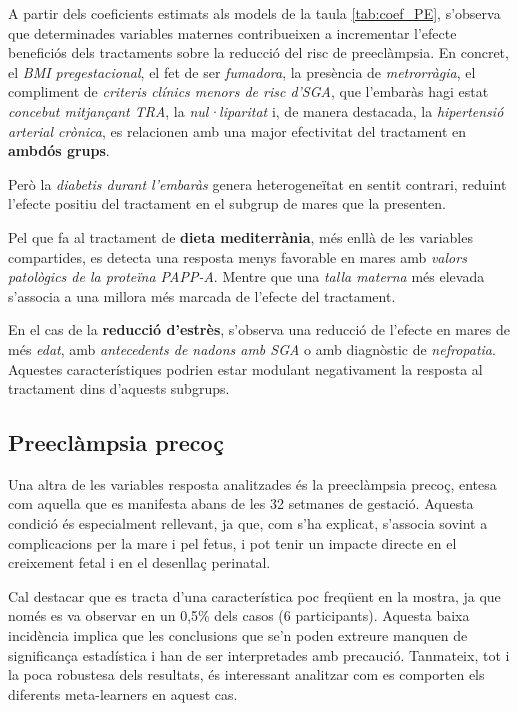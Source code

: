 \documentclass[../main.tex]{subfiles}
\begin{document}
    A partir dels coeficients estimats als models de la taula \ref{tab:coef_PE}, s’observa que determinades variables maternes contribueixen a incrementar l’efecte beneficiós dels tractaments sobre la reducció del risc de preeclàmpsia. En concret, el \textit{BMI pregestacional}, el fet de ser \textit{fumadora}, la presència de \textit{metrorràgia}, el compliment de \textit{criteris clínics menors de risc d’SGA}, que l’embaràs hagi estat \textit{concebut mitjançant TRA}, la \textit{nul·liparitat} i, de manera destacada, la \textit{hipertensió arterial crònica}, es relacionen amb una major efectivitat del tractament en \textbf{ambdós grups}.\par
    Però la \textit{diabetis durant l’embaràs} genera heterogeneïtat en sentit contrari, reduint l’efecte positiu del tractament en el subgrup de mares que la presenten.\par
    Pel que fa al tractament de \textbf{dieta mediterrània}, més enllà de les variables compartides, es detecta una resposta menys favorable en mares amb \textit{valors patològics de la proteïna PAPP-A}. Mentre que una \textit{talla materna} més elevada s’associa a una millora més marcada de l’efecte del tractament.\par
    En el cas de la \textbf{reducció d'estrès}, s’observa una reducció de l’efecte en mares de més \textit{edat}, amb \textit{antecedents de nadons amb SGA} o amb diagnòstic de \textit{nefropatia}. Aquestes característiques podrien estar modulant negativament la resposta al tractament dins d’aquests subgrups.
    

    


    \subsection{Preeclàmpsia precoç}\label{subsec:PEearly}

    Una altra de les variables resposta analitzades és la preeclàmpsia precoç, entesa com aquella que es manifesta abans de les 32 setmanes de gestació. Aquesta condició és especialment rellevant, ja que, com s'ha explicat, s’associa sovint a complicacions per la mare i pel fetus, i pot tenir un impacte directe en el creixement fetal i en el desenllaç perinatal.\par
    Cal destacar que es tracta d’una característica poc freqüent en la mostra, ja que només es va observar en un 0,5\% dels casos (6 participants). Aquesta baixa incidència implica que les conclusions que se’n poden extreure manquen de significança estadística i han de ser interpretades amb precaució. Tanmateix, tot i la poca robustesa dels resultats, és interessant analitzar com es comporten els diferents meta-learners en aquest cas.
    
\end{document}
